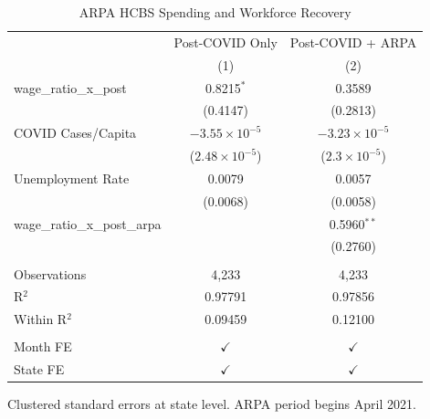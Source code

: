 
\begin{table}[htbp]
   \caption{\label{tab:arpa} ARPA HCBS Spending and Workforce Recovery}
   \bigskip
   \centering
   \begin{tabular}{lcc}
      \toprule
                                     & Post-COVID Only         & Post-COVID + ARPA \\   
                                     & (1)                     & (2)\\  
      \midrule 
      wage\_ratio\_x\_post           & 0.8215$^{*}$            & 0.3589\\   
                                     & (0.4147)                & (0.2813)\\   
      COVID Cases/Capita             & $-3.55\times 10^{-5}$   & $-3.23\times 10^{-5}$\\    
                                     & ($2.48\times 10^{-5}$)  & ($2.3\times 10^{-5}$)\\    
      Unemployment Rate              & 0.0079                  & 0.0057\\   
                                     & (0.0068)                & (0.0058)\\   
      wage\_ratio\_x\_post\_arpa     &                         & 0.5960$^{**}$\\   
                                     &                         & (0.2760)\\   
       \\
      Observations                   & 4,233                   & 4,233\\  
      R$^2$                          & 0.97791                 & 0.97856\\  
      Within R$^2$                   & 0.09459                 & 0.12100\\  
       \\
      Month FE                       & $\checkmark$            & $\checkmark$\\   
      State FE                       & $\checkmark$            & $\checkmark$\\   
      \bottomrule
   \end{tabular}
   
   \par \raggedright 
   Clustered standard errors at state level. ARPA period begins April 2021.
\end{table}



